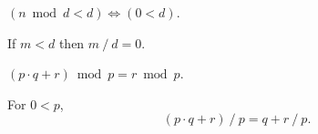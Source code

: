 \begin{lemma}
  \label{lem:ltn_mod}
  \rocqok
  $(n \bmod d < d) \iff (0 < d)$.
\end{lemma}

\begin{lemma}
  \label{lem:divn_small}
  \rocqok
  If $m < d$ then $m \mathbin{/} d = 0$.
\end{lemma}

\begin{lemma}
  \label{lem:modnMDl}
  \rocqok
  $(p \cdot q + r) \bmod p = r \bmod p$.
\end{lemma}

\begin{lemma}
  \label{lem:divnMDl}
  \rocqok
  For $0 < p$,
  \[
    (p \cdot q + r) \mathbin{/} p = q + r \mathbin{/} p.
  \]
\end{lemma}
